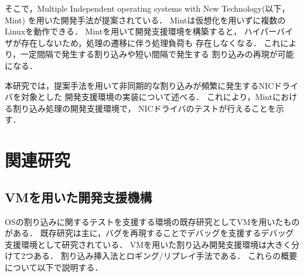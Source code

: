 \documentclass[submit,techreq,noauthor,dvipdfmx]{ipsj}
\begin{document}
そこで，Multiple Independent operating systems with New Technology(以下，Mint)\cite{senzaki}
を用いた開発手法が提案されている．
Mintは仮想化を用いずに複数のLinuxを動作できる．
Mintを用いて開発支援環境を構築すると，
ハイパーバイザが存在しないため，処理の遷移に伴う処理負荷も
存在しなくなる．
これにより，一定間隔で発生する割り込みや短い間隔で発生する
割り込みの再現が可能になる．

本研究では，提案手法を用いて非同期的な割り込みが頻繁に発生するNICドライバを対象とした
開発支援環境の実装について述べる．
これにより，Mintにおける割り込み処理の開発支援環境で，
NICドライバのテストが行えることを示す．

\section{関連研究}\label{chap:related_reserch}

\subsection{VMを用いた開発支援機構}\label{sec:debugging_support_mechanism_with_VM}

OSの割り込みに関するテストを支援する環境の既存研究としてVMを用いたものがある．
既存研究は主に，バグを再現することでデバッグを支援するデバッグ支援環境として研究されている．
VMを用いた割り込み開発支援環境は大きく分けて2つある．
割り込み挿入法\cite{miyahara}とロギング/リプレイ手法\cite{samuel}\cite{jim}\cite{kawasaki}である．
これらの概要について以下で説明する．
\end{document}

